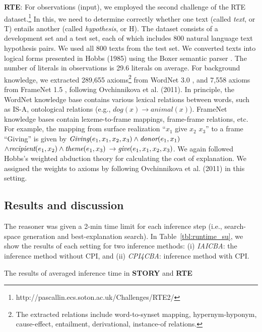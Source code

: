 \documentclass[english]{jnlp_1.4}
\begin{document}
\textbf{RTE}: For observations (input), we employed the second
challenge of the RTE
dataset.\footnote{http://pascallin.ecs.soton.ac.uk/Challenges/RTE2/}
In this, we need to determine correctly whether one text
(called \emph{text}, or T) entails another (called \emph{hypothesis},
or H). The dataset consists of a development set and a test set,
each of which includes 800 natural language text hypothesis pairs. We
used all 800 texts from the test set. We converted texts
into logical forms presented in Hobbs (1985)\nocite{Hobbs85} using the Boxer
semantic parser \cite{Bos08}. The number of literals in observations
is 29.6 literals on average. For background knowledge, we 
extracted 289,655 axioms\footnote{The extracted relations include
  word-to-synset mapping, hypernym-hyponym, cause-effect, entailment,
  derivational, instance-of relations.} from WordNet 3.0
\cite{fellbaum98}, and 7,558 axioms from FrameNet 1.5
\cite{framenetII}, following Ovchinnikova et al. (2011)\nocite{Ovch11}. In
principle, the WordNet knowledge base contains various lexical relations between
words, such as IS-A, ontological relations (e.g., {\small $dog(x)
  \rightarrow animal(x)$}). FrameNet knowledge bases contain
lexeme-to-frame mappings, frame-frame relations, etc. For example, the
mapping from surface realization ``$x_1$ give $x_2$ $x_3$'' to a frame
``Giving'' is given by
{\small $\emph{Giving}(e_1,x_1,x_2,x_3) \land
  \emph{donor}(e_1,x_1)$ $\land \emph{recipient}(e_1,x_2)
  \land \emph{theme}(e_1,x_3)$ $\rightarrow
  \emph{give}(e_1,x_1,x_2,x_3)$}.
We again followed Hobbs's weighted
abduction theory for calculating the cost of explanation. We assigned
the weights to axioms by following Ovchinnikova et
al. (2011)\nocite{Ovch11} in this setting.


\subsection{Results and discussion}


The reasoner was given a 2-min time limit for each inference step
(i.e., search-space generation and best-explanation search). 
In Table~\ref{tbl:runtime_su}, we show the results of each setting for two
inference methods: (i) \emph{IAICBA}: the
inference method without CPI, and (ii) \emph{CPI4CBA}: inference
method with CPI.

\begin{table}[t]
\caption{The results of averaged inference time in \textbf{STORY} and \textbf{RTE}}
\label{tbl:runtime_su}

\end{table}
\end{document}
